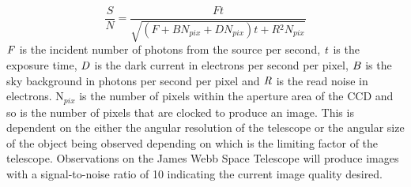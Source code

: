 \documentclass[pdf,color]{UoBnote}
\begin{document}
\begin{equation}
\frac{S}{N} = \frac{Ft}{\sqrt{(F + BN_{pix} + DN_{pix})t + R{^2}N_{pix}}}
\end{equation}
\newline
$\it{F}$ is the incident number of photons from the source per second, $\it{t}$ is the exposure time, $\it{D}$ is the dark current in electrons per second per pixel, $\it{B}$ is the sky background in photons per second per pixel and $\it{R}$ is the read noise in electrons. N$_{pix}$ is the number of pixels within the aperture area of the CCD and so is the number of pixels that are clocked to produce an image. This is dependent on the either the angular resolution of the telescope or the angular size of the object being observed depending on which is the limiting factor of the telescope. Observations on the James Webb Space Telescope will produce images with a signal-to-noise ratio of 10 indicating the current image quality desired.
\end{document}
